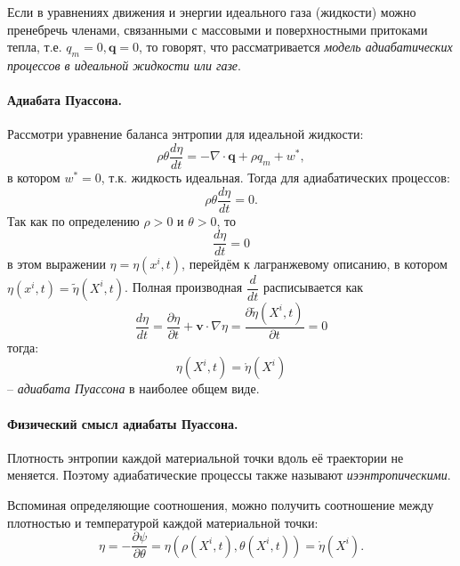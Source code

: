 
\begin{definition}
  Если в уравнениях движения и энергии идеального газа (жидкости) можно пренебречь членами,
  связанными с массовыми и поверхностными притоками тепла, т.е. $q_m = 0, \mathbf{q} = 0$,
  то говорят, что рассматривается \emph{модель адиабатических процессов в идеальной жидкости
  или газе}.
\end{definition}


\paragraph{Адиабата Пуассона.}

Рассмотри уравнение баланса энтропии для идеальной жидкости:
\[
  \rho \theta \dfrac{d\eta}{dt} = - \nabla\cdot\mathbf{q} + \rho q_m + w^*,
\]
в котором $w^* = 0$, т.к. жидкость идеальная.
Тогда для адиабатических процессов:
\[
  \rho\theta \dfrac{d\eta}{dt} = 0.
\]
Так как по определению $\rho > 0$ и $\theta > 0$, то
\[
  \dfrac{d\eta}{dt} = 0
\]
в этом выражении $\eta = \eta(x^i, t)$, перейдём к лагранжевому описанию, в котором
$\eta(x^i, t) = \tilde \eta(X^i, t)$. Полная производная $\dfrac{d}{dt}$ расписывается как
\[
  \dfrac{d\eta}{dt} = \dfrac{\partial \eta}{\partial t} + \mathbf{v} \cdot \nabla \eta =
  \dfrac{\partial \tilde \eta (X^i, t)}{\partial t} = 0
\]
тогда:
\[
  \eta(X^i, t) = \mathring{\eta}(X^i)
\]
-- \emph{адиабата Пуассона} в наиболее общем виде.

\paragraph{Физический смысл адиабаты Пуассона.}
Плотность энтропии каждой материальной точки вдоль её траектории не меняется. Поэтому адиабатические процессы также называют \emph{иээнтропическими}.


Вспоминая определяющие соотношения, можно получить соотношение между плотностью и температурой каждой материальной точки:
\[
  \eta = - \dfrac{\partial \psi}{\partial \theta} =
  \eta \left(\rho(X^i, t), \theta(X^i, t) \right) = \mathring{\eta}(X^i).
\]
